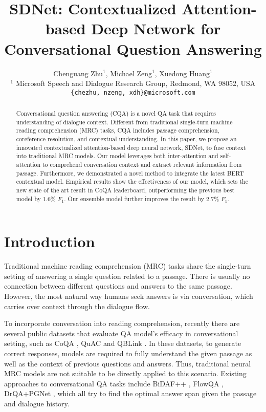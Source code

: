 \documentclass{article} \usepackage{sdnet,times}
\title{SDNet: Contextualized Attention-based Deep Network for Conversational Question Answering}
\author{Chenguang Zhu$^{1}$, Michael Zeng$^{1}$, Xuedong Huang$^{1}$\\
$^1$ Microsoft Speech and Dialogue Research Group, Redmond, WA 98052, USA\\
\texttt{\{chezhu, nzeng, xdh\}@microsoft.com} \\
}
\begin{document}
\maketitle

\begin{abstract}
Conversational question answering (CQA) is a novel QA task that requires understanding of dialogue context. Different from traditional single-turn machine reading comprehension (MRC) tasks, CQA includes passage comprehension, coreference resolution, and contextual understanding. In this paper, we propose an innovated contextualized attention-based deep neural network, SDNet, to fuse context into traditional MRC models. Our model 
leverages both inter-attention and self-attention to comprehend conversation context and extract relevant information from passage. Furthermore, we demonstrated a novel method to integrate the latest BERT contextual model. Empirical results show the effectiveness of our model, which sets the new state of the art result in CoQA leaderboard, outperforming the previous best model by 1.6\% $F_1$. Our ensemble model further improves the result by 2.7\% $F_1$.
\end{abstract}

\section{Introduction}
Traditional machine reading comprehension (MRC) tasks share the single-turn setting of answering a single question related to a passage. There is usually no connection between different questions and answers to the same passage. However, the most natural way humans seek answers is via conversation, which carries over context through the dialogue flow. 

To incorporate conversation into reading comprehension, recently there are several public datasets that evaluate QA model's efficacy in conversational setting, such as CoQA \citep{coqa}, QuAC \citep{quac} and QBLink \citep{qblink}. In these datasets, to generate correct responses, models are required to fully understand the given passage as well as the context of previous questions and answers. Thus, traditional neural MRC models are not suitable to be directly applied to this scenario. Existing approaches to conversational QA tasks include BiDAF++ \citep{bidafplusplus}, FlowQA \citep{flowqa}, DrQA+PGNet \citep{coqa}, which all try to find the optimal answer span given the passage and dialogue history.
\end{document}
